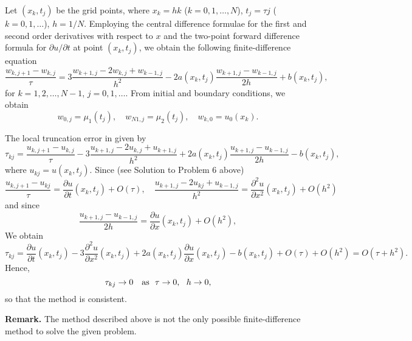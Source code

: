 \documentclass[10pt]{article}
\def\pr{{\partial}}
\begin{document}
\vskip 0.5cm  Let $(x_{k},t_{j})$ be the
grid points, where $x_{k}=hk$ ($k=0,1,\dots,N$), $t_{j}=\tau j$
($k=0,1,\dots$), $h=1/N$. Employing the central difference
formulae for the first and second order derivatives with respect
to $x$ and the two-point forward difference formula for $\pr u/\pr
t$ at point $(x_{k},t_{j})$, we obtain the following
finite-difference equation
\[
\frac{w_{k,j+1}-w_{k,j}}{\tau}=3\frac{w_{k+1,j}-2w_{k,j}+w_{k-1,j}}{h^{2}}-
2a(x_{k},t_{j})\frac{w_{k+1,j}-w_{k-1,j}}{2h}+b(x_{k},t_{j}),
\]
for $k=1,2,\dots,N-1$, $j=0,1,\dots$. From initial and boundary
conditions, we obtain
\[
w_{0,j}=\mu_{1}(t_{j}), \quad w_{N1,j}=\mu_{2}(t_{j}),
\quad w_{k,0}=u_{0}(x_{k}) .
\]

\vskip 0.3cm \noindent
The local truncation error in given by
\[
\tau_{kj}=\frac{u_{k,j+1}-u_{k,j}}{\tau}-3\frac{u_{k+1,j}-2u_{k,j}+u_{k+1,j}}{h^{2}}+
2a(x_{k},t_{j})\frac{u_{k+1,j}-u_{k-1,j}}{2h}-b(x_{k},t_{j}),
\]
where $u_{kj}=u(x_{k},t_{j})$. Since (see Solution to Problem 6 above)
\[
\frac{u_{k,j+1}-u_{kj}}{\tau}=
\frac{\pr u}{\pr t}(x_{k},t_{j}) + O(\tau), \quad
\frac{u_{k+1, j}-2u_{kj}+u_{k-1,j}}{h^{2}}=
\frac{\pr^{2} u}{\pr x^{2}}(x_{k},t_{j})
+ O(h^{2})
\]
and since
\[
\frac{u_{k+1,j}-u_{k-1,j}}{2h}=\frac{\pr u}{\pr x}(x_{k},t_{j})
+O(h^{2}),
\]
We obtain
\[
\tau_{kj}=
\frac{\pr u}{\pr t}(x_{k},t_{j})-3\frac{\pr^{2} u}{\pr x^{2}}(x_{k},t_{j})+
2a(x_{k},t_{j})\frac{\pr u}{\pr x}(x_{k},t_{j})-b(x_{k},t_{j})
+O(\tau)+O(h^2)=O(\tau+h^2).
\]
Hence,
\[
\tau_{kj} \to 0 \quad {\rm as} \ \ \tau\to 0, \ \ h\to 0,
\]
so that the method is consistent.

\vskip 0.3cm \noindent
{\bf Remark.} The method described above is not the only possible finite-difference
method to solve the given problem.
\end{document}

